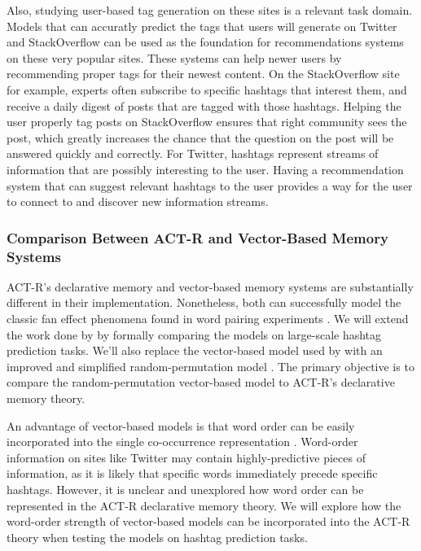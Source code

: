 \documentclass[man]{apa6}
\begin{document}
Also, studying user-based tag generation on these sites is a relevant task domain.
Models that can accuratly predict the tags that users will generate on Twitter and StackOverflow can be used as the foundation for recommendations systems on these very popular sites.
These systems can help newer users by recommending proper tags for their newest content.
On the StackOverflow site for example, experts often subscribe to specific hashtags that interest them, and receive a daily digest of posts that are tagged with those hashtags.
Helping the user properly tag posts on StackOverflow ensures that right community sees the post, which greatly increases the chance that the question on the post will be answered quickly and correctly.
For Twitter, hashtags represent streams of information that are possibly interesting to the user.
Having a recommendation system that can suggest relevant hashtags to the user provides a way for the user to connect to and discover new information streams.

\subsubsection{Comparison Between ACT-R and Vector-Based Memory Systems}

ACT-R's declarative memory and vector-based memory systems are substantially different in their implementation.
Nonetheless, both can successfully model the classic fan effect phenomena found in word pairing experiments \parencite{Rutledge2008}.
We will extend the work done by \textcite{Rutledge2008} by formally comparing the models on large-scale hashtag prediction tasks.
We'll also replace the vector-based model used by \textcite{Rutledge2008} with an improved and simplified random-permutation model \parencite{Sahlgren2008}.
The primary objective is to compare the random-permutation vector-based model to ACT-R's declarative memory theory.

An advantage of vector-based models is that word order can be easily incorporated into the single co-occurrence representation \parencite{Jones2007}.
Word-order information on sites like Twitter may contain highly-predictive pieces of information, as it is likely that specific words immediately precede specific hashtags.
However, it is unclear and unexplored how word order can be represented in the ACT-R declarative memory theory.
We will explore how the word-order strength of vector-based models can be incorporated into the ACT-R theory when testing the models on hashtag prediction tasks.
\end{document}
